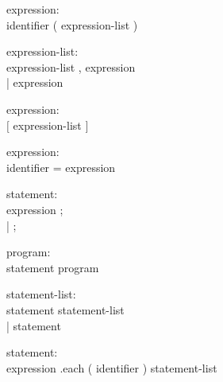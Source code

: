 \begin{description}
  \item[]expression: \hfill \\
    identifier ( expression-list )
\end{description}

\begin{description}
  \item[]expression-list: \hfill \\
    expression-list , expression \\
    | expression
\end{description}

\begin{description}
  \item[]expression: \hfill \\
    $[$ expression-list $]$
\end{description}

\begin{description}
  \item[]expression: \hfill \\
    identifier = expression
\end{description}

\begin{description}
  \item[]statement: \hfill \\
    expression ; \\
    | ;
\end{description}

\begin{description}
  \item[]program: \hfill \\
    statement program
\end{description}

\begin{description}
  \item[]statement-list: \hfill \\
    statement statement-list \\
    | statement
\end{description}

\begin{description}
  \item[]statement: \hfill \\
    expression .each ( identifier ) { statement-list }
\end{description}
